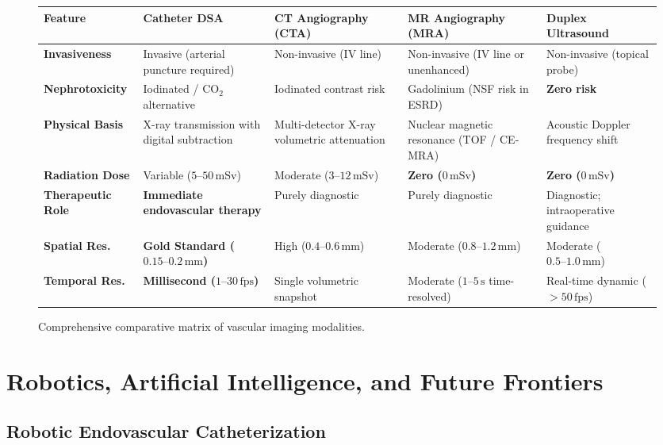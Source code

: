 \documentclass[11pt,a4paper]{article}
\begin{document}
\begin{figure}[htbp]
\centering
\small
\setlength{\tabcolsep}{3pt}
\begin{tabular}{p{2.7cm}p{2.9cm}p{2.9cm}p{3.1cm}p{2.8cm}}
\toprule
\textbf{Feature} & \textbf{Catheter DSA} & \textbf{CT Angiography (CTA)} & \textbf{MR Angiography (MRA)} & \textbf{Duplex Ultrasound} \\
\midrule
\textbf{Invasiveness} & Invasive (arterial puncture required) & Non-invasive (IV line) & Non-invasive (IV line or unenhanced) & Non-invasive (topical probe) \\
\addlinespace
\textbf{Nephrotoxicity} & Iodinated / $\text{CO}_2$ alternative & Iodinated contrast risk & Gadolinium (NSF risk in ESRD) & \textbf{Zero risk} \\
\addlinespace
\textbf{Physical Basis} & X-ray transmission with digital subtraction & Multi-detector X-ray volumetric attenuation & Nuclear magnetic resonance (TOF / CE-MRA) & Acoustic Doppler frequency shift \\
\addlinespace
\textbf{Radiation Dose} & Variable ($5\text{--}50\,\text{mSv}$) & Moderate ($3\text{--}12\,\text{mSv}$) & \textbf{Zero ($0\,\text{mSv}$)} & \textbf{Zero ($0\,\text{mSv}$)} \\
\addlinespace
\textbf{Therapeutic Role} & \textbf{Immediate endovascular therapy} & Purely diagnostic & Purely diagnostic & Diagnostic; intraoperative guidance \\
\addlinespace
\textbf{Spatial Res.} & \textbf{Gold Standard ($0.15\text{--}0.2\,\text{mm}$)} & High ($0.4\text{--}0.6\,\text{mm}$) & Moderate ($0.8\text{--}1.2\,\text{mm}$) & Moderate ($0.5\text{--}1.0\,\text{mm}$) \\
\addlinespace
\textbf{Temporal Res.} & \textbf{Millisecond ($1\text{--}30\,\text{fps}$)} & Single volumetric snapshot & Moderate ($1\text{--}5\,\text{s}$ time-resolved) & Real-time dynamic ($> 50\,\text{fps}$) \\
\bottomrule
\end{tabular}
\caption{Comprehensive comparative matrix of vascular imaging modalities.}
\label{tab:vascular_comparison}
\end{figure}

\section{Robotics, Artificial Intelligence, and Future Frontiers}

\subsection{Robotic Endovascular Catheterization}
\end{document}

